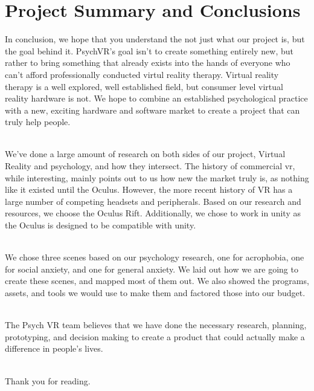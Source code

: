 \documentclass[a4paper,10pt]{article}
\begin{document}
\pagebreak
\section{Project Summary and Conclusions}
In conclusion, we hope that you understand the not just what our project is, but the goal behind it.  PsychVR's goal isn't to create something entirely new, but rather to bring something that already exists into the hands of everyone who can't afford professionally conducted virtul reality therapy.  Virtual reality therapy is a well explored, well established field, but consumer level virtual reality hardware is not.  We hope to combine an established psychological practice with a new, exciting hardware and software market to create a project that can truly help people. 
\par ~\\
We've done a large amount of research on both sides of our project, Virtual Reality and psychology, and how they intersect.  The history of commercial vr, while interesting, mainly points out to us how new the market truly is, as nothing like it existed until the Oculus.  However, the more recent history of VR has a large number of competing headsets and peripherals.  Based on our research and resources, we choose the Oculus Rift.  Additionally, we chose to work in unity as the Oculus is designed to be compatible with unity.  
\par ~\\
We chose three scenes based on our psychology research, one for acrophobia, one for social anxiety, and one for general anxiety.  We laid out how we are going to create these scenes, and mapped most of them out.  We also showed the programs, assets, and tools we would use to make them and factored those into our budget.
\par ~\\
The Psych VR team believes that we have done the necessary research, planning, prototyping, and decision making to create a product that could actually make a difference in people's lives.
\par ~\\
Thank you for reading.
\pagebreak

\setcounter{page}{0}
\end{document}
